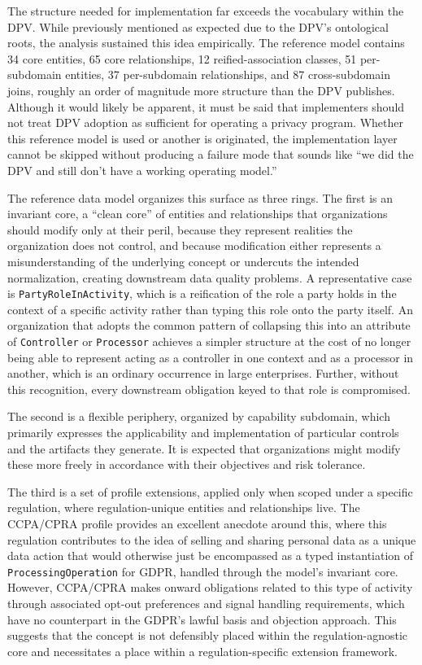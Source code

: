 \documentclass[10pt,letterpaper,twocolumn,twoside]{rho-class/rho}
\begin{document}
The structure needed for implementation far exceeds the vocabulary within the DPV. While previously mentioned as expected due to the DPV's ontological roots, the analysis sustained this idea empirically. The reference model contains 34 core entities, 65 core relationships, 12 reified-association classes, 51 per-subdomain entities, 37 per-subdomain relationships, and 87 cross-subdomain joins, roughly an order of magnitude more structure than the DPV publishes. Although it would likely be apparent, it must be said that implementers should not treat DPV adoption as sufficient for operating a privacy program. Whether this reference model is used or another is originated, the implementation layer cannot be skipped without producing a failure mode that sounds like ``we did the DPV and still don't have a working operating model.''

The reference data model organizes this surface as three rings. The first is an invariant core, a ``clean core'' of entities and relationships that organizations should modify only at their peril, because they represent realities the organization does not control, and because modification either represents a misunderstanding of the underlying concept or undercuts the intended normalization, creating downstream data quality problems. A representative case is \texttt{PartyRoleInActivity}, which is a reification of the role a party holds in the context of a specific activity rather than typing this role onto the party itself. An organization that adopts the common pattern of collapsing this into an attribute of \texttt{Controller} or \texttt{Processor} achieves a simpler structure at the cost of no longer being able to represent acting as a controller in one context and as a processor in another, which is an ordinary occurrence in large enterprises. Further, without this recognition, every downstream obligation keyed to that role is compromised. 

The second is a flexible periphery, organized by capability subdomain, which primarily expresses the applicability and implementation of particular controls and the artifacts they generate. It is expected that organizations might modify these more freely in accordance with their objectives and risk tolerance. 

The third is a set of profile extensions, applied only when scoped under a specific regulation, where regulation-unique entities and relationships live. The CCPA/CPRA profile provides an excellent anecdote around this, where this regulation contributes to the idea of selling and sharing personal data as a unique data action that would otherwise just be encompassed as a typed instantiation of \texttt{ProcessingOperation} for GDPR, handled through the model's invariant core. However, CCPA/CPRA makes onward obligations related to this type of activity through associated opt-out preferences and signal handling requirements, which have no counterpart in the GDPR's lawful basis and objection approach. This suggests that the concept is not defensibly placed within the regulation-agnostic core and necessitates a place within a regulation-specific extension framework.
\end{document}
